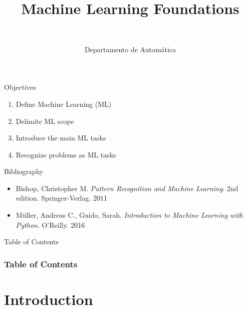 \documentclass[10pt,compress]{beamer} %
\title[Machine Learning Foundations]{Machine Learning Foundations}
\author{\asignatura\\\carrera}
\institute{}
\date{Departamento de Automática}
\begin{document}
{\titlepageBlue
    \begin{frame}
        \titlepage
    \end{frame}
}

\institute{\asignatura}

\begin{frame}[plain]{}
   \begin{block}{Objectives}
      \begin{enumerate}
         \item Define Machine Learning (ML)
		 \item Delimite ML scope
         \item Introduce the main ML tasks
         \item Recognize problems as ML tasks
      \end{enumerate} 
   \end{block}

   \begin{block}{Bibliography}
	\begin{itemize}
        \item Bishop, Christopher M. \textit{Pattern Recognition and Machine Learning}. 2nd edition. Springer-Verlag. 2011
        \item M\"uller, Andreas C., Guido, Sarah. \textit{Introduction to Machine Learning with Python}. O'Reilly. 2016
	\end{itemize}
   \end{block}
\end{frame}

{
\begin{frame}[shrink]{Table of Contents}

 	\frametitle{Table of Contents}
  	\begin{multicols}{2}
  		\tableofcontents
    \end{multicols}

\end{frame}
}

\section{Introduction}
\end{document}
